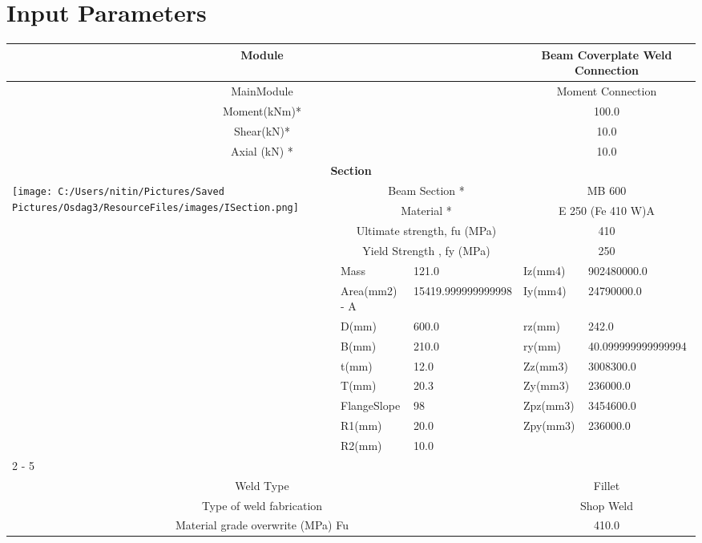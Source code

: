 \documentclass{article}%
\begin{document}
%
\normalsize%
\pagestyle{header}%
\section{Input Parameters}%
\label{sec:InputParameters}%
\renewcommand{\arraystretch}{1.2}%
\begin{longtable}{|p{5cm}|p{2cm}|p{2cm}|p{2cm}|p{5cm}|}%
\hline%
\hline%
\multicolumn{3}{|c|}{Module}&\multicolumn{2}{|c|}{Beam Coverplate  Weld Connection}\\%
\hline%
\hline%
\multicolumn{3}{|c|}{MainModule}&\multicolumn{2}{|c|}{Moment Connection}\\%
\hline%
\hline%
\multicolumn{3}{|c|}{Moment(kNm)*}&\multicolumn{2}{|c|}{100.0}\\%
\hline%
\hline%
\multicolumn{3}{|c|}{Shear(kN)*}&\multicolumn{2}{|c|}{10.0}\\%
\hline%
\hline%
\multicolumn{3}{|c|}{Axial (kN) *}&\multicolumn{2}{|c|}{10.0}\\%
\hline%
\hline%
\multicolumn{5}{|c|}{\textbf{Section}}\\%
\hline%
\hline%
\multirow{13}{*}{\texttt{[image: C:/Users/nitin/Pictures/Saved Pictures/Osdag3/ResourceFiles/images/ISection.png]}}&\multicolumn{2}{|c|}{Beam Section *}&\multicolumn{2}{|c|}{MB 600}\\%
\cline{2%
-%
5}%
&\multicolumn{2}{|c|}{Material *}&\multicolumn{2}{|c|}{E 250 (Fe 410 W)A}\\%
\cline{2%
-%
5}%
&\multicolumn{2}{|c|}{Ultimate strength, fu (MPa)}&\multicolumn{2}{|c|}{410}\\%
\cline{2%
-%
5}%
&\multicolumn{2}{|c|}{Yield Strength , fy (MPa)}&\multicolumn{2}{|c|}{250}\\%
\cline{2%
-%
5}%
&Mass&121.0&Iz(mm4)&902480000.0\\%
\cline{2%
-%
5}%
&Area(mm2) {-} A&15419.999999999998&Iy(mm4)&24790000.0\\%
\cline{2%
-%
5}%
&D(mm)&600.0&rz(mm)&242.0\\%
\cline{2%
-%
5}%
&B(mm)&210.0&ry(mm)&40.099999999999994\\%
\cline{2%
-%
5}%
&t(mm)&12.0&Zz(mm3)&3008300.0\\%
\cline{2%
-%
5}%
&T(mm)&20.3&Zy(mm3)&236000.0\\%
\cline{2%
-%
5}%
&FlangeSlope&98&Zpz(mm3)&3454600.0\\%
\cline{2%
-%
5}%
&R1(mm)&20.0&Zpy(mm3)&236000.0\\%
\cline{2%
-%
5}%
&R2(mm)&10.0&&\\%
\cline{2%
-%
5}%
\hline%
\multicolumn{5}{|c|}{\textbf{Weld Details}}\\%
\hline%
\hline%
\multicolumn{3}{|c|}{Weld Type}&\multicolumn{2}{|c|}{Fillet}\\%
\hline%
\hline%
\multicolumn{3}{|c|}{Type of weld fabrication}&\multicolumn{2}{|c|}{Shop Weld}\\%
\hline%
\hline%
\multicolumn{3}{|c|}{Material grade overwrite (MPa) Fu}&\multicolumn{2}{|c|}{410.0}\\%
\hline%
\end{longtable}
\end{document}
